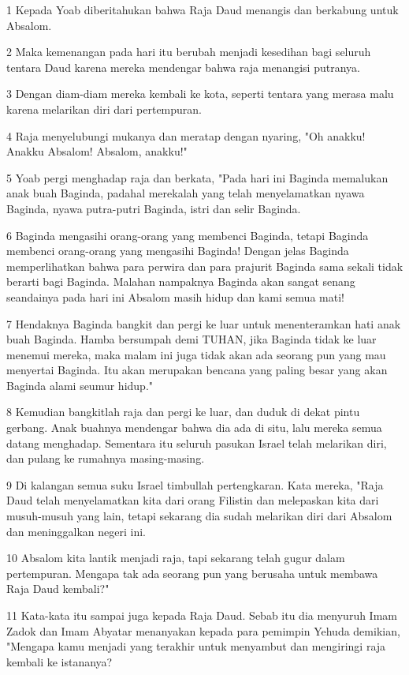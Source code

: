 \par 1 Kepada Yoab diberitahukan bahwa Raja Daud menangis dan berkabung untuk Absalom.
\par 2 Maka kemenangan pada hari itu berubah menjadi kesedihan bagi seluruh tentara Daud karena mereka mendengar bahwa raja menangisi putranya.
\par 3 Dengan diam-diam mereka kembali ke kota, seperti tentara yang merasa malu karena melarikan diri dari pertempuran.
\par 4 Raja menyelubungi mukanya dan meratap dengan nyaring, "Oh anakku! Anakku Absalom! Absalom, anakku!"
\par 5 Yoab pergi menghadap raja dan berkata, "Pada hari ini Baginda memalukan anak buah Baginda, padahal merekalah yang telah menyelamatkan nyawa Baginda, nyawa putra-putri Baginda, istri dan selir Baginda.
\par 6 Baginda mengasihi orang-orang yang membenci Baginda, tetapi Baginda membenci orang-orang yang mengasihi Baginda! Dengan jelas Baginda memperlihatkan bahwa para perwira dan para prajurit Baginda sama sekali tidak berarti bagi Baginda. Malahan nampaknya Baginda akan sangat senang seandainya pada hari ini Absalom masih hidup dan kami semua mati!
\par 7 Hendaknya Baginda bangkit dan pergi ke luar untuk menenteramkan hati anak buah Baginda. Hamba bersumpah demi TUHAN, jika Baginda tidak ke luar menemui mereka, maka malam ini juga tidak akan ada seorang pun yang mau menyertai Baginda. Itu akan merupakan bencana yang paling besar yang akan Baginda alami seumur hidup."
\par 8 Kemudian bangkitlah raja dan pergi ke luar, dan duduk di dekat pintu gerbang. Anak buahnya mendengar bahwa dia ada di situ, lalu mereka semua datang menghadap. Sementara itu seluruh pasukan Israel telah melarikan diri, dan pulang ke rumahnya masing-masing.
\par 9 Di kalangan semua suku Israel timbullah pertengkaran. Kata mereka, "Raja Daud telah menyelamatkan kita dari orang Filistin dan melepaskan kita dari musuh-musuh yang lain, tetapi sekarang dia sudah melarikan diri dari Absalom dan meninggalkan negeri ini.
\par 10 Absalom kita lantik menjadi raja, tapi sekarang telah gugur dalam pertempuran. Mengapa tak ada seorang pun yang berusaha untuk membawa Raja Daud kembali?"
\par 11 Kata-kata itu sampai juga kepada Raja Daud. Sebab itu dia menyuruh Imam Zadok dan Imam Abyatar menanyakan kepada para pemimpin Yehuda demikian, "Mengapa kamu menjadi yang terakhir untuk menyambut dan mengiringi raja kembali ke istananya?
